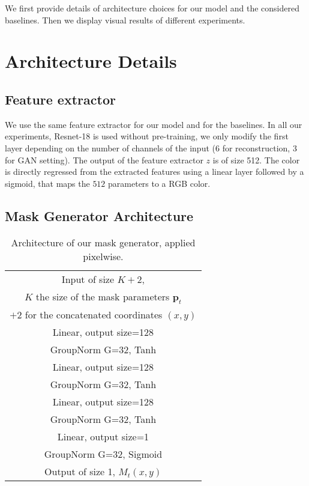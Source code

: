 \documentclass[10pt,twocolumn,letterpaper]{article}
\begin{document}
We first provide details of architecture choices for our model and the considered baselines. Then we display visual results of different experiments. 

\section{Architecture Details}\subsection{Feature extractor}
We use the same feature extractor for our model and for the baselines. In all our experiments, Resnet-18 is used without pre-training, we only modify the first layer depending on the number of channels of the input (6 for reconstruction, 3 for GAN setting). The output of the feature extractor $z$ is of size 512. The color is directly regressed from the extracted features using a linear layer followed by a sigmoid, that maps the $512$ parameters to a RGB color.

\subsection{Mask Generator Architecture}\begin{table}[ht]
	\caption{\label{tab:maskgen_arch} Architecture of our mask generator, applied pixelwise.}
   	\centering
   	\begin{tabular}{c}
		\toprule
	 	Input of size $K+2$,\\
	 	$K$ the size of the mask parameters $\textbf{p}_t$ \\
	    $+2$ for the concatenated coordinates $(x,y)$ \\
       	\midrule
        Linear, output size=128 \\
        GroupNorm G=32, Tanh \\
        \midrule
        Linear, output size=128 \\
        GroupNorm G=32, Tanh \\
		\midrule
		Linear, output size=128 \\
        GroupNorm G=32, Tanh \\
        \midrule
        Linear, output size=1 \\
        GroupNorm G=32, Sigmoid \\
        \midrule
        Output of size 1, $M_t(x,y)$ \\
		\bottomrule
	\end{tabular}
\end{table}
\end{document}
